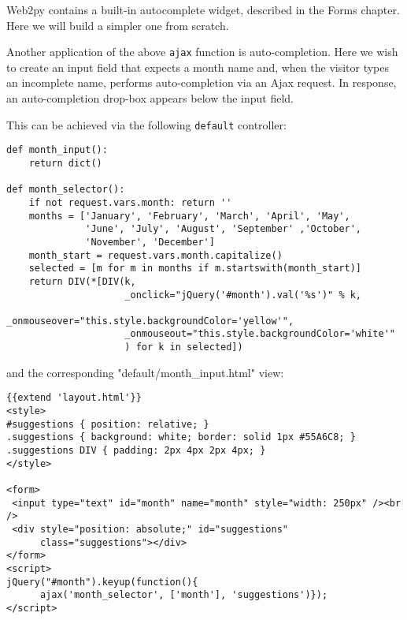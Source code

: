 \documentclass[justified,sixbynine,notoc]{tufte-book}
\def\ft{\small\tt}
\begin{document}
\begin{fullwidth}
Web2py contains a built-in autocomplete widget, described in the Forms chapter. Here we will build a simpler one from scratch.

Another application of the above {\ft ajax} function is auto-completion. Here we wish to create an input field that expects a month name and, when the visitor types an incomplete name, performs auto-completion via an Ajax request. In response, an auto-completion drop-box appears below the input field.

This can be achieved via the following {\ft default} controller:
\begin{lstlisting}
def month_input():
    return dict()

def month_selector():
    if not request.vars.month: return ''
    months = ['January', 'February', 'March', 'April', 'May',
              'June', 'July', 'August', 'September' ,'October',
              'November', 'December']
    month_start = request.vars.month.capitalize()
    selected = [m for m in months if m.startswith(month_start)]
    return DIV(*[DIV(k,
                     _onclick="jQuery('#month').val('%s')" % k,
                     _onmouseover="this.style.backgroundColor='yellow'",
                     _onmouseout="this.style.backgroundColor='white'"
                     ) for k in selected])
\end{lstlisting}
\noindent and the corresponding "default/month\_input.html" view:
\begin{lstlisting}[keywords={}]
{{extend 'layout.html'}}
<style>
#suggestions { position: relative; }
.suggestions { background: white; border: solid 1px #55A6C8; }
.suggestions DIV { padding: 2px 4px 2px 4px; }
</style>

<form>
 <input type="text" id="month" name="month" style="width: 250px" /><br />
 <div style="position: absolute;" id="suggestions"
      class="suggestions"></div>
</form>
<script>
jQuery("#month").keyup(function(){
      ajax('month_selector', ['month'], 'suggestions')});
</script>
\end{lstlisting}


\end{fullwidth}
\end{document}

